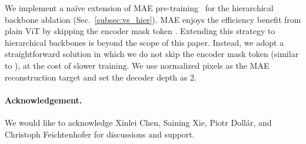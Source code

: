 \documentclass[runningheads]{llncs}
\begin{document}
We implement a na\"ive extension of MAE pre-training~\cite{He2021} for the hierarchical backbone ablation (Sec.~\ref{subsec:vs_hier}).
MAE enjoys the efficiency benefit from plain ViT by skipping the encoder mask token \cite{He2021}. Extending this strategy to hierarchical backbones is beyond the scope of this paper. Instead, we adopt a straightforward solution in which we do not skip the encoder mask token (similar to \cite{Devlin2019}), at the cost of slower training.
We use normalized pixels as the MAE reconstruction target \cite{He2021} and set the decoder depth as 2. 

\vspace{1em}
\paragraph{Acknowledgement.} We would like to acknowledge Xinlei Chen, Saining Xie, Piotr Doll\'ar, and Christoph Feichtenhofer for discussions and support.



\end{document}
